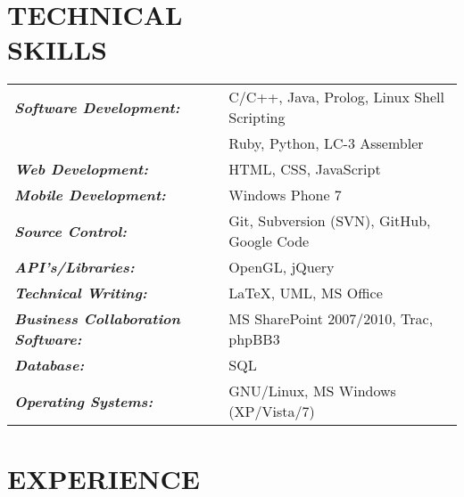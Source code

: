 \documentclass[margin]{res}
\begin{document}
\begin{resume}
\section{TECHNICAL \\ SKILLS}
	\begin{tabular}{l l}
	{\sl \textbf{Software Development:}} &
  C/C++, Java, Prolog, Linux Shell Scripting \\ &
  Ruby, Python, LC-3 Assembler \\

	{\sl \textbf{Web Development:}} &
	HTML, CSS, JavaScript \\

	{\sl \textbf{Mobile Development:}} &
	Windows Phone 7 \\

	{\sl \textbf{Source Control:}} &
	Git, Subversion (SVN), GitHub, Google Code \\

	{\sl \textbf{API's/Libraries:}} &
	OpenGL, jQuery \\

	{\sl \textbf{Technical Writing:}} &
	\LaTeX, UML, MS Office \\

	{\sl \textbf{Business Collaboration Software:}} &
  MS SharePoint 2007/2010, Trac, phpBB3 \\
	  
	{\sl \textbf{Database:}} &	  
  SQL \\	  
	  
	{\sl \textbf{Operating Systems:}} &
  GNU/Linux, MS Windows (XP/Vista/7)

	\end{tabular}	 

\section{EXPERIENCE}


\end{resume}
\end{document}
